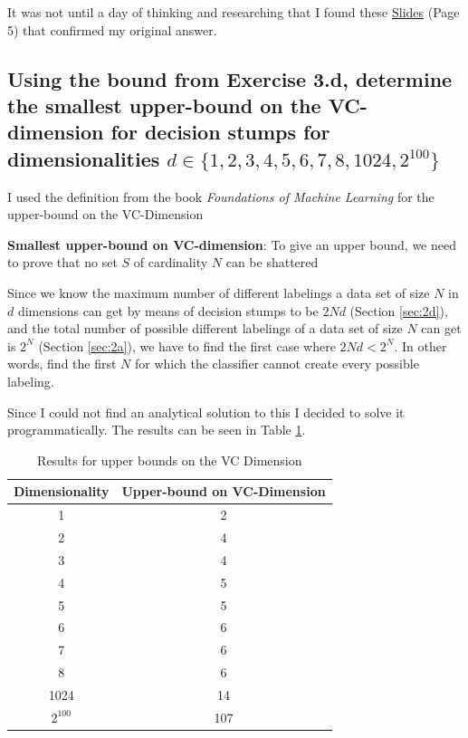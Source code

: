 \documentclass[11pt,a4paper]{article}
\begin{document}
It was not until a day of thinking and researching that I found these \href{https://people.csail.mit.edu/alinush/6.867-fall-2013/2013.10.22.w8.tu-lecture-13-generalization-part-2.pdf}{Slides} (Page 5) that confirmed my original answer.

\subsection{Using the bound from Exercise 3.d, determine the smallest upper-bound on the VC-dimension for decision stumps for dimensionalities $d ∈ \{1, 2, 3, 4, 5, 6, 7, 8, 1024, 2^{100}\}$}
\label{sec:3e}
I used the definition from the book \textit{Foundations of Machine Learning} \cite{foundations_of_machine_learning} for the upper-bound on the VC-Dimension

\textbf{Smallest upper-bound on VC-dimension}: To give an upper bound, we need to prove that no set $S$ of cardinality $N$ can be shattered

Since we know the maximum number of different labelings a data set of size $N$ in $d$ dimensions can get by means of decision stumps to be $2Nd$ (Section \ref{sec:2d}), and the total number of possible different labelings of a data set of size $N$ can get is $2^N$ (Section \ref{sec:2a}), we have to find the first case where $2Nd < 2^N$. In other words, find the first $N$ for which the classifier cannot create every possible labeling.

Since I could not find an analytical solution to this I decided to solve it programmatically. The results can be seen in Table \ref{tab:upper-bound-vc}.

\begin{table}
    \begin{tabular}{|c|c|}
    \hline
    Dimensionality & Upper-bound on VC-Dimension \\ \hline
    1              & 2                            \\ \hline
    2              & 4                            \\ \hline
    3              & 4                            \\ \hline
    4              & 5                            \\ \hline
    5              & 5                            \\ \hline
    6              & 6                            \\ \hline
    7              & 6                           \\ \hline
    8              & 6                            \\ \hline
    1024           & 14                            \\ \hline
    $2^{100}$        & 107 \\
    \hline
    \end{tabular}
    \caption{Results for upper bounds on the VC Dimension}
    \label{tab:upper-bound-vc}
\end{table}
\end{document}
